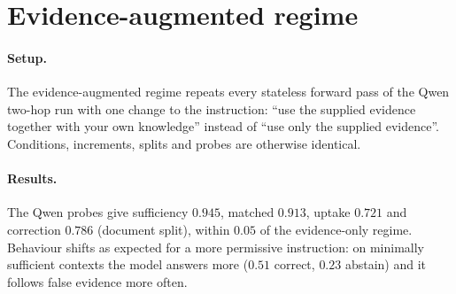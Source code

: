 \section{Evidence-augmented regime}
\label{app:augmented}
\paragraph{Setup.} The evidence-augmented regime repeats every stateless forward pass of the Qwen two-hop run with one change to the instruction: ``use the supplied evidence together with your own knowledge'' instead of ``use only the supplied evidence''. Conditions, increments, splits and probes are otherwise identical.

\paragraph{Results.} The Qwen probes give sufficiency $0.945$, matched $0.913$, uptake $0.721$ and correction $0.786$ (document split), within $0.05$ of the evidence-only regime. Behaviour shifts as expected for a more permissive instruction: on minimally sufficient contexts the model answers more ($0.51$ correct, $0.23$ abstain) and it follows false evidence more often.
